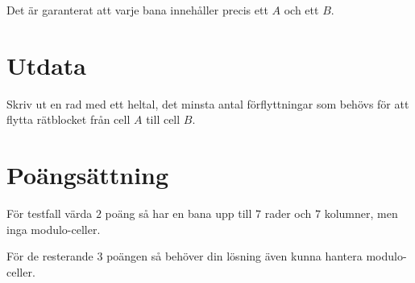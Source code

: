 Det är garanterat att varje bana innehåller precis ett $A$ och ett $B$.

\section*{Utdata}

Skriv ut en rad med ett heltal, det minsta antal förflyttningar som behövs för att flytta rätblocket från cell $A$ till cell $B$.

\section*{Poängsättning}

För testfall värda $2$ poäng så har en bana upp till $7$ rader och $7$ kolumner, men inga modulo-celler.

\noindent För de resterande $3$ poängen så behöver din lösning även kunna hantera modulo-celler.
